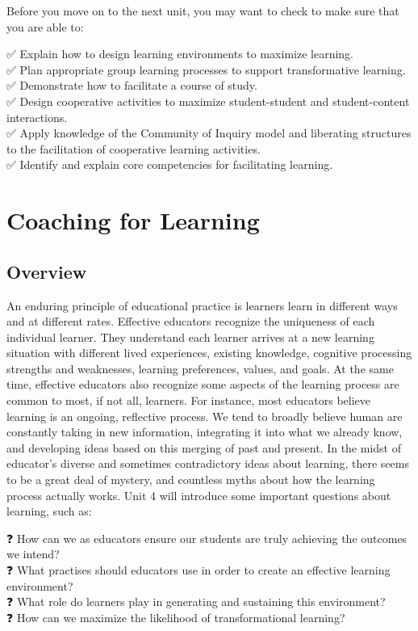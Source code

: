 \documentclass[
]{book}
\begin{document}
Before you move on to the next unit, you may want to check to make sure that you are able to:

✅ Explain how to design learning environments to maximize learning.\\
✅ Plan appropriate group learning processes to support transformative learning.\\
✅ Demonstrate how to facilitate a course of study.\\
✅ Design cooperative activities to maximize student-student and student-content interactions.\\
✅ Apply knowledge of the Community of Inquiry model and liberating structures to the facilitation of cooperative learning activities.\\
✅ Identify and explain core competencies for facilitating learning.

\hypertarget{coaching-for-learning}{%
\chapter{Coaching for Learning}\label{coaching-for-learning}}

\hypertarget{overview-3}{%
\section*{Overview}\label{overview-3}}

An enduring principle of educational practice is learners learn in different ways and at different rates. Effective educators recognize the uniqueness of each individual learner. They understand each learner arrives at a new learning situation with different lived experiences, existing knowledge, cognitive processing strengths and weaknesses, learning preferences, values, and goals. At the same time, effective educators also recognize some aspects of the learning process are common to most, if not all, learners. For instance, most educators believe learning is an ongoing, reflective process. We tend to broadly believe human are constantly taking in new information, integrating it into what we already know, and developing ideas based on this merging of past and present. In the midst of educator's diverse and sometimes contradictory ideas about learning, there seems to be a great deal of mystery, and countless myths about how the learning process actually works. Unit 4 will introduce some important questions about learning, such as:

❓ How can we as educators ensure our students are truly achieving the outcomes we intend?\\
❓ What practises should educators use in order to create an effective learning environment?\\
❓ What role do learners play in generating and sustaining this environment?\\
❓ How can we maximize the likelihood of transformational learning?
\end{document}
